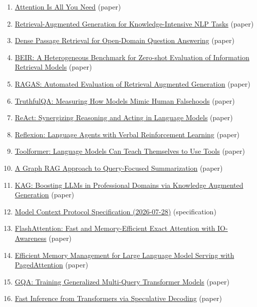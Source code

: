\begin{enumerate}
\item \href{https://arxiv.org/abs/1706.03762}{Attention Is All You Need} (paper)
\item \href{https://arxiv.org/abs/2005.11401}{Retrieval-Augmented Generation for Knowledge-Intensive NLP Tasks} (paper)
\item \href{https://arxiv.org/abs/2004.04906}{Dense Passage Retrieval for Open-Domain Question Answering} (paper)
\item \href{https://arxiv.org/abs/2104.08663}{BEIR: A Heterogeneous Benchmark for Zero-shot Evaluation of Information Retrieval Models} (paper)
\item \href{https://arxiv.org/abs/2309.15217}{RAGAS: Automated Evaluation of Retrieval Augmented Generation} (paper)
\item \href{https://arxiv.org/abs/2109.07958}{TruthfulQA: Measuring How Models Mimic Human Falsehoods} (paper)
\item \href{https://arxiv.org/abs/2210.03629}{ReAct: Synergizing Reasoning and Acting in Language Models} (paper)
\item \href{https://arxiv.org/abs/2303.11366}{Reflexion: Language Agents with Verbal Reinforcement Learning} (paper)
\item \href{https://arxiv.org/abs/2302.04761}{Toolformer: Language Models Can Teach Themselves to Use Tools} (paper)
\item \href{https://arxiv.org/abs/2404.16130}{A Graph RAG Approach to Query-Focused Summarization} (paper)
\item \href{https://arxiv.org/abs/2409.13731}{KAG: Boosting LLMs in Professional Domains via Knowledge Augmented Generation} (paper)
\item \href{https://modelcontextprotocol.io/specification/2026-07-28}{Model Context Protocol Specification (2026-07-28)} (specification)
\item \href{https://arxiv.org/abs/2205.14135}{FlashAttention: Fast and Memory-Efficient Exact Attention with IO-Awareness} (paper)
\item \href{https://arxiv.org/abs/2309.06180}{Efficient Memory Management for Large Language Model Serving with PagedAttention} (paper)
\item \href{https://arxiv.org/abs/2305.13245}{GQA: Training Generalized Multi-Query Transformer Models} (paper)
\item \href{https://arxiv.org/abs/2211.17192}{Fast Inference from Transformers via Speculative Decoding} (paper)

\end{enumerate}
